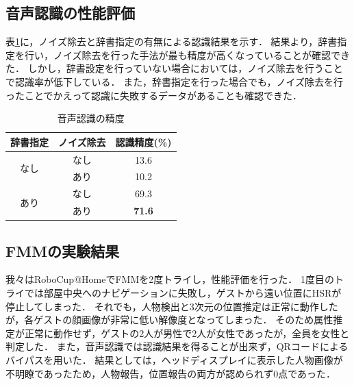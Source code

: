 \documentclass[a4j]{jarticle}
\begin{document}
\subsection{音声認識の性能評価}
表\ref{voice_recognition_result}に，ノイズ除去と辞書指定の有無による認識結果を示す．
結果より，辞書指定を行い，ノイズ除去を行った手法が最も精度が高くなっていることが確認できた．
しかし，辞書設定を行っていない場合においては，ノイズ除去を行うことで認識率が低下している．
また，辞書指定を行った場合でも，ノイズ除去を行ったことでかえって認識に失敗するデータがあることも確認できた．
\begin{table}[b]
	\centering
	\caption{音声認識の精度}
	\begin{tabular}{|c|c|c|}
	\hline
	辞書指定                & ノイズ除去 & 認識精度(\%)          \\ \hline
	\multirow{2}{*}{なし} & なし    & 13.6          \\ \cline{2-3}
	                    & あり    & 10.2          \\ \hline
	\multirow{2}{*}{あり} & なし    & 69.3          \\ \cline{2-3}
	                    & あり    & \textbf{71.6} \\ \hline
	\end{tabular}
	\label{voice_recognition_result}
\end{table}

\subsection{FMMの実験結果}
我々はRoboCup@HomeでFMMを2度トライし，性能評価を行った．
1度目のトライでは部屋中央へのナビゲーションに失敗し，ゲストから遠い位置にHSRが停止してしまった．
それでも，人物検出と3次元の位置推定は正常に動作したが，各ゲストの顔画像が非常に低い解像度となってしまった．
そのため属性推定が正常に動作せず，ゲストの2人が男性で2人が女性であったが，全員を女性と判定した．
また，音声認識では認識結果を得ることが出来ず，QRコードによるバイパスを用いた．
結果としては，ヘッドディスプレイに表示した人物画像が不明瞭であったため，人物報告，位置報告の両方が認められず0点であった．
\end{document}
